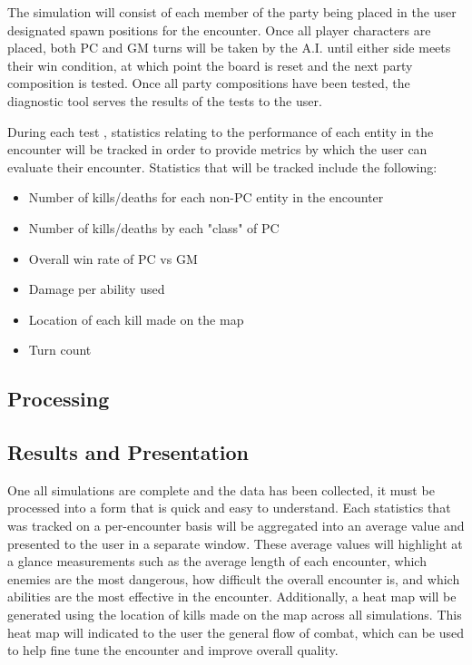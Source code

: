 \documentclass[12pt,a4paper]{report}
\begin{document}
		The simulation will consist of each member of the party being placed in the user designated spawn positions for the encounter. Once all player characters are placed, both PC and GM turns will be taken by the A.I. until either side meets their win condition, at which point the board is reset and the next party composition is tested. Once all party compositions have been tested, the diagnostic tool serves the results of the tests to the user.
		
		 During each test , statistics relating to the performance of each entity in the encounter will be tracked in order to provide metrics by which the user can evaluate their encounter. Statistics that will be tracked include the following:
		 
		\begin{itemize}
			\item Number of kills/deaths for each non-PC entity in the encounter
			\item Number of kills/deaths by each "class" of PC
			\item Overall win rate of PC vs GM
			\item Damage per ability used
			\item Location of each kill made on the map
			\item Turn count
		\end{itemize}
		
		
		\subsection{Processing}
	
		\subsection{Results and Presentation}
		One all simulations are complete and the data has been collected, it must be processed into a form that is quick and easy to understand. Each statistics that was tracked on a per-encounter basis will be aggregated into an average value and presented to the user in a separate window. These average values will highlight at a glance measurements such as the average length of each encounter, which enemies are the most dangerous, how difficult the overall encounter is, and which abilities are the most effective in the encounter. Additionally, a heat map will be generated using the location of kills made on the map across all simulations. This heat map will indicated to the user the general flow of combat, which can be used to help fine tune the encounter and improve overall quality. 
	
\end{document}
